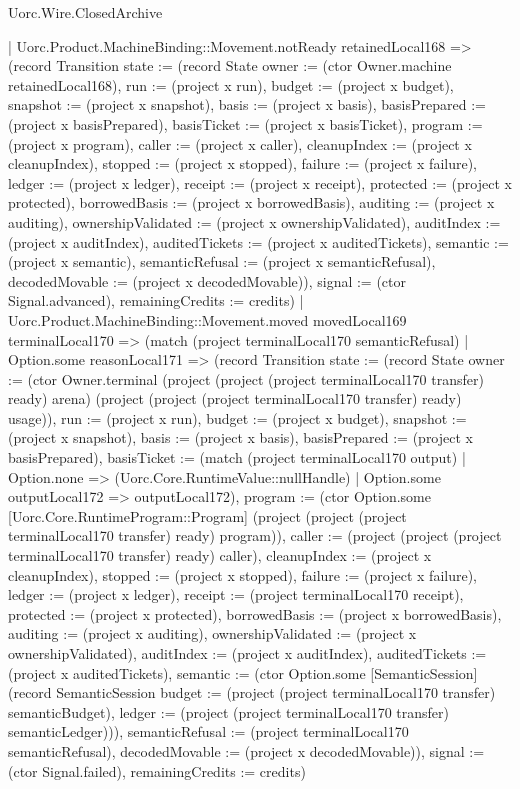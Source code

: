 \begin{lexlean}{Uorc.Wire.ClosedArchive}
\begin{semanticmodule}
{      | Uorc.Product.MachineBinding::Movement.notReady retainedLocal168 => (record Transition {state := (record State {owner := (ctor Owner.machine retainedLocal168), run := (project x run), budget := (project x budget), snapshot := (project x snapshot), basis := (project x basis), basisPrepared := (project x basisPrepared), basisTicket := (project x basisTicket), program := (project x program), caller := (project x caller), cleanupIndex := (project x cleanupIndex), stopped := (project x stopped), failure := (project x failure), ledger := (project x ledger), receipt := (project x receipt), protected := (project x protected), borrowedBasis := (project x borrowedBasis), auditing := (project x auditing), ownershipValidated := (project x ownershipValidated), auditIndex := (project x auditIndex), auditedTickets := (project x auditedTickets), semantic := (project x semantic), semanticRefusal := (project x semanticRefusal), decodedMovable := (project x decodedMovable)}), signal := (ctor Signal.advanced), remainingCredits := credits})
      | Uorc.Product.MachineBinding::Movement.moved movedLocal169 terminalLocal170 => (match (project terminalLocal170 semanticRefusal)
        | Option.some reasonLocal171 => (record Transition {state := (record State {owner := (ctor Owner.terminal (project (project (project terminalLocal170 transfer) ready) arena) (project (project (project terminalLocal170 transfer) ready) usage)), run := (project x run), budget := (project x budget), snapshot := (project x snapshot), basis := (project x basis), basisPrepared := (project x basisPrepared), basisTicket := (match (project terminalLocal170 output)
          | Option.none => (Uorc.Core.RuntimeValue::nullHandle)
          | Option.some outputLocal172 => outputLocal172), program := (ctor Option.some [Uorc.Core.RuntimeProgram::Program] (project (project (project terminalLocal170 transfer) ready) program)), caller := (project (project (project terminalLocal170 transfer) ready) caller), cleanupIndex := (project x cleanupIndex), stopped := (project x stopped), failure := (project x failure), ledger := (project x ledger), receipt := (project terminalLocal170 receipt), protected := (project x protected), borrowedBasis := (project x borrowedBasis), auditing := (project x auditing), ownershipValidated := (project x ownershipValidated), auditIndex := (project x auditIndex), auditedTickets := (project x auditedTickets), semantic := (ctor Option.some [SemanticSession] (record SemanticSession {budget := (project (project terminalLocal170 transfer) semanticBudget), ledger := (project (project terminalLocal170 transfer) semanticLedger)})), semanticRefusal := (project terminalLocal170 semanticRefusal), decodedMovable := (project x decodedMovable)}), signal := (ctor Signal.failed), remainingCredits := credits})
}
\end{semanticmodule}
\end{lexlean}
